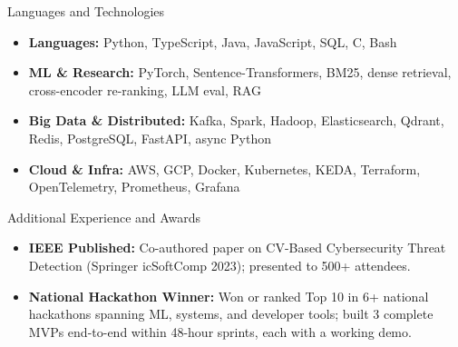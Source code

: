\documentclass[]{mcdowellcv}
\begin{document}
\begin{cvsection}{Languages and Technologies}
  \begin{cvsubsection}{}{}{}
    \begin{itemize}
      \item \textbf{Languages:} Python, TypeScript, Java, JavaScript, SQL, C, Bash
      \item \textbf{ML \& Research:} PyTorch, Sentence-Transformers, BM25, dense retrieval, cross-encoder re-ranking, LLM eval, RAG
      \item \textbf{Big Data \& Distributed:} Kafka, Spark, Hadoop, Elasticsearch, Qdrant, Redis, PostgreSQL, FastAPI, async Python
      \item \textbf{Cloud \& Infra:} AWS, GCP, Docker, Kubernetes, KEDA, Terraform, OpenTelemetry, Prometheus, Grafana
    \end{itemize}
  \end{cvsubsection}
\end{cvsection}

\begin{cvsection}{Additional Experience and Awards}
  \begin{cvsubsection}{}{}{}
    \begin{itemize}
      \item \textbf{IEEE Published:} Co-authored paper on CV-Based Cybersecurity Threat Detection (Springer icSoftComp 2023); presented to 500+ attendees.
      \item \textbf{National Hackathon Winner:} Won or ranked Top 10 in 6+ national hackathons spanning ML, systems, and developer tools; built 3 complete MVPs end-to-end within 48-hour sprints, each with a working demo.
    \end{itemize}
  \end{cvsubsection}
\end{cvsection}
\end{document}
